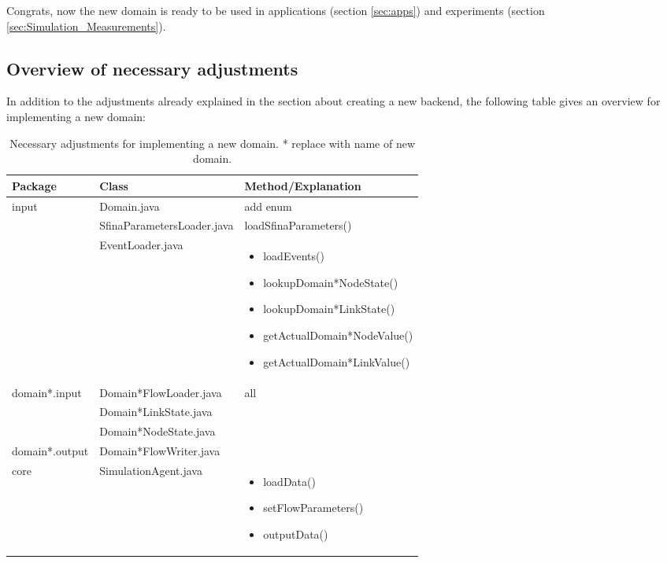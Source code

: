 \documentclass[11pt,fleqn]{book} %
\begin{document}
Congrats, now the new domain is ready to be used in applications (section \ref{sec:apps}) and experiments (section \ref{sec:Simulation_Measurements}).

\subsection{Overview of necessary adjustments}
In addition to the adjustments already explained in the section about creating a new backend, the following table gives an overview for implementing a new domain:

\begin{table}[h]
	\centering
	\begin{tabular}{|l|l|l|}
		\hline
		\rowcolor{Gray}
		Package & Class & Method/Explanation\\
		\hline 
		\multirow{3}{*}{input}& Domain.java & add enum\\
		\cline{2-3}
		& SfinaParametersLoader.java & loadSfinaParameters()\\
		\cline{2-3}
		& EventLoader.java & {\parbox{5.5cm}{
		\begin{itemize}[leftmargin=*,label={-}]
			\item loadEvents()
			\item lookupDomain*NodeState()
			\item lookupDomain*LinkState()
			\item getActualDomain*NodeValue()
			\item getActualDomain*LinkValue()
		\end{itemize}}}\\
		\hline
		\multirow{3}{*}{domain*.input} & Domain*FlowLoader.java & \multirow{4}{*}{all}\\
		\cline{2-2}
		& Domain*LinkState.java & \\
		\cline{2-2}
		& Domain*NodeState.java & \\
		\cline{1-2}
		domain*.output & Domain*FlowWriter.java & \\
		\hline
		core & SimulationAgent.java & {\parbox{4cm}{\begin{itemize}[label={-},leftmargin=*]
			\item loadData()
			\item setFlowParameters()
			\item outputData()
		\end{itemize}}} \\
		\hline
		\end{tabular}
		\caption{Necessary adjustments for implementing a new domain. * replace with name of new domain.}
		\end{table}
\end{document}
